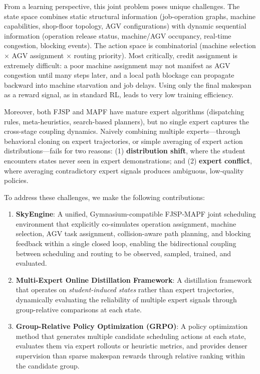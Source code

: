 \documentclass[11pt,a4paper]{article}
\begin{document}
From a learning perspective, this joint problem poses unique challenges. The state space combines static structural information (job-operation graphs, machine capabilities, shop-floor topology, AGV configurations) with dynamic sequential information (operation release status, machine/AGV occupancy, real-time congestion, blocking events). The action space is combinatorial (machine selection $\times$ AGV assignment $\times$ routing priority). Most critically, credit assignment is extremely difficult: a poor machine assignment may not manifest as AGV congestion until many steps later, and a local path blockage can propagate backward into machine starvation and job delays. Using only the final makespan as a reward signal, as in standard RL, leads to very low training efficiency.

Moreover, both FJSP and MAPF have mature expert algorithms (dispatching rules, meta-heuristics, search-based planners), but no single expert captures the cross-stage coupling dynamics. Naively combining multiple experts---through behavioral cloning on expert trajectories, or simple averaging of expert action distributions---fails for two reasons: (1) \textbf{distribution shift}, where the student encounters states never seen in expert demonstrations; and (2) \textbf{expert conflict}, where averaging contradictory expert signals produces ambiguous, low-quality policies.

To address these challenges, we make the following contributions:

\begin{enumerate}[leftmargin=*]
    \item \textbf{SkyEngine}: A unified, Gymnasium-compatible FJSP-MAPF joint scheduling environment that explicitly co-simulates operation assignment, machine selection, AGV task assignment, collision-aware path planning, and blocking feedback within a single closed loop, enabling the bidirectional coupling between scheduling and routing to be observed, sampled, trained, and evaluated.
    \item \textbf{Multi-Expert Online Distillation Framework}: A distillation framework that operates on \emph{student-induced states} rather than expert trajectories, dynamically evaluating the reliability of multiple expert signals through group-relative comparisons at each state.
    \item \textbf{Group-Relative Policy Optimization (GRPO)}: A policy optimization method that generates multiple candidate scheduling actions at each state, evaluates them via expert rollouts or heuristic metrics, and provides denser supervision than sparse makespan rewards through relative ranking within the candidate group.
\end{enumerate}
\end{document}
